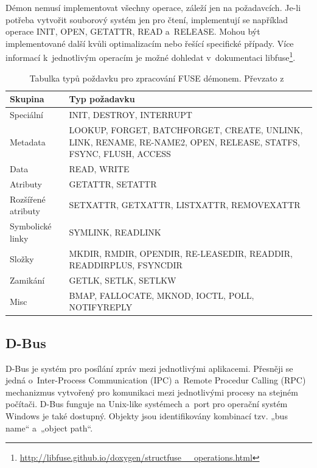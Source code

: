 Démon nemusí implementovat všechny operace, záleží jen na požadavcích. Je-li potřeba vytvořit souborový systém jen pro čtení, implementují se například operace
INIT, OPEN, GETATTR, READ a RELEASE. Mohou být implementované další kvůli optimalizacím nebo řešící specifické případy. Více informací k jednotlivým operacím
je možné dohledat v dokumentaci libfuse\footnote{\url{http://libfuse.github.io/doxygen/structfuse__operations.html}}.

\newpage

\begin{table}[h]
    \begin{center}
        \begin{tabularx}{14cm}{|l|X|} 
            \hline
            \textbf{Skupina} & \textbf{Typ požadavku} \\
            \hline
            Speciální & INIT, DESTROY, INTERRUPT \\
            \hline
            Metadata & LOOKUP, FORGET, BATCHFORGET, CREATE, UNLINK, LINK, RENAME, RE-NAME2, OPEN, RELEASE, STATFS, FSYNC, FLUSH, ACCESS \\
            \hline
            Data & READ, WRITE \\
            \hline
            Atributy & GETATTR, SETATTR \\
            \hline
            Rozšířené atributy & SETXATTR, GETXATTR, LISTXATTR, REMOVEXATTR \\
            \hline
            Symbolické linky & SYMLINK, READLINK \\
            \hline
            Složky & MKDIR, RMDIR, OPENDIR, RE-LEASEDIR, READDIR, READDIRPLUS, FSYNCDIR \\
            \hline
            Zamikání & GETLK, SETLK, SETLKW \\
            \hline
            Misc & BMAP, FALLOCATE, MKNOD, IOCTL, POLL, NOTIFYREPLY \\
            \hline
        \end{tabularx}
        \caption{Tabulka typů poždavku pro zpracování FUSE démonem. Převzato z \cite{FuseOrNotToFuse}}
    \end{center}
\end{table}

\subsection{D-Bus}

D-Bus je systém pro posílání zpráv mezi jednotlivými aplikacemi. Přesněji se jedná o Inter-Process Communication (IPC) a Remote Procedur Calling (RPC) mechanizmus
vytvořený pro komunikaci mezi jednotlivými procesy na stejném počítači. D-Bus funguje na Unix-like systémech a port pro operační systém Windows je také dostupný. Objekty
jsou identifikovány kombinací tzv. „bus name“ a „object path“. \cite{DBus}

